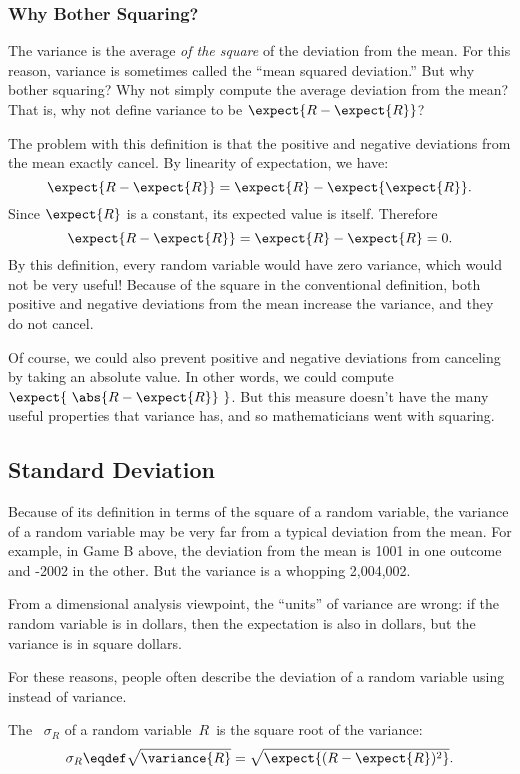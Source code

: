 \subsubsection{Why Bother Squaring?}

The variance is the average \emph{of the square} of the deviation from the
mean.  For this reason, variance is sometimes called the ``mean squared
deviation.''  But why bother squaring?  Why not simply compute the average
deviation from the mean?  That is, why not define variance to be
$\expect{R - \expect{R}}$?

The problem with this definition is that the positive and negative
deviations from the mean exactly cancel.  By linearity of expectation,
we have:
\[
  \expect{R - \expect{R}} = \expect{R} - \expect{\expect{R}}.
\]
Since $\expect{R}$ is a constant, its expected value is itself. Therefore
\[
\expect{R - \expect{R}} = \expect{R} - \expect{R} = 0.
\]
By this definition, every random variable would have zero variance,
which would not be very useful!  Because of the square in the
conventional definition, both positive and negative deviations from
the mean increase the variance, and they do not cancel.

Of course, we could also prevent positive and negative deviations from
canceling by taking an absolute value.  In other words, we could
compute $\expect{\ \abs{R - \expect{R}}\ }$.  But this measure doesn't
have the many useful properties that variance has, and so
mathematicians went with squaring.

\subsection{Standard Deviation}

Because of its definition in terms of the square of a random variable,
the variance of a random variable may be very far from a typical
deviation from the mean.  For example, in Game B above, the deviation
from the mean is 1001 in one outcome and -2002 in the other. But the
variance is a whopping 2,004,002.

From a dimensional analysis viewpoint, the ``units'' of variance are
wrong: if the random variable is in dollars, then the expectation is
also in dollars, but the variance is in square dollars.  

For these reasons, people often describe the deviation of a random
variable using  instead of variance.

\begin{definition}
The ~$\sigma_R$ of a random variable~$R$~is
the square root of the variance:
\[
    \sigma_R \eqdef \sqrt{\variance{R}} = \sqrt{\expect{(R - \expect{R})^2}}.
\]
\end{definition}

